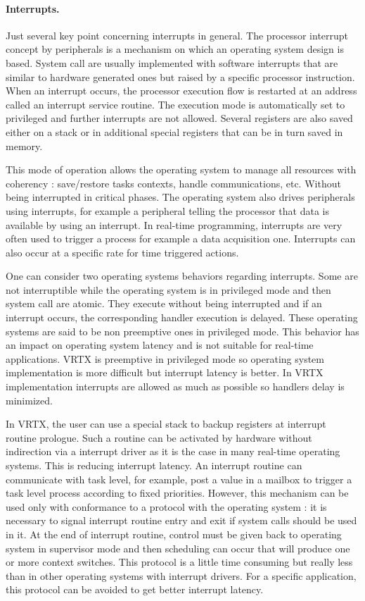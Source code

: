 \documentclass[10pt]{report}
\begin{document}
\paragraph{Interrupts.} Just several key point concerning interrupts in general. The processor interrupt concept by peripherals
is a mechanism on which an operating system design is based. System call are usually implemented with software interrupts that
are similar to hardware generated ones but raised by a specific processor instruction. When an interrupt occurs, the processor
execution flow is restarted at an address called an interrupt service routine. The execution mode is automatically set to
privileged and further interrupts are not allowed. Several registers are also saved either on a stack or in additional special
registers that can be in turn saved in memory.

This mode of operation allows the operating system to manage all resources with coherency : save/restore tasks contexts, handle
communications, etc. Without being interrupted in critical phases. The operating system also drives peripherals using interrupts,
for example a peripheral telling the processor that data is available by using an interrupt. In real-time programming, interrupts
are very often used to trigger a process for example a data acquisition one. Interrupts can also occur at a specific rate for time
triggered actions.

One can consider two operating systems behaviors regarding interrupts. Some are not interruptible while the operating system is
in privileged mode and then system call are atomic. They execute without being interrupted and if an interrupt occurs, the
corresponding handler execution is delayed. These operating systems are said to be non preemptive ones in privileged mode. This
behavior has an impact on operating system latency and is not suitable for real-time applications. VRTX is preemptive in
privileged mode so operating system implementation is more difficult but interrupt latency is better. In VRTX implementation
interrupts are allowed as much as possible so handlers delay is minimized.

In VRTX, the user can use a special stack to backup registers at interrupt routine prologue. Such a routine can be activated by
hardware without indirection via a interrupt driver as it is the case in many real-time operating systems. This is reducing
interrupt latency. An interrupt routine can communicate with task level, for example, post a value in a mailbox to trigger
a task level process according to fixed priorities. However, this mechanism can be used only with conformance to a protocol
with the operating system : it is necessary to signal interrupt routine entry and exit if system calls should be used in it.
At the end of interrupt routine, control must be given back to operating system in supervisor mode and then scheduling can
occur that will produce one or more context switches. This protocol is a little time consuming but really less than in other
operating systems with interrupt drivers. For a specific application, this protocol can be avoided to get better interrupt
latency.
\end{document}
